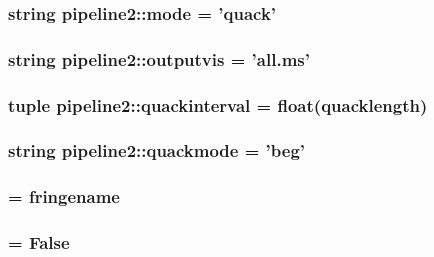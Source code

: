 \hypertarget{namespacepipeline2_a64dbb436e00eaaf809aca44a0584bceb}{
\subsubsection[{mode}]{\setlength{\rightskip}{0pt plus 5cm}string {\bf pipeline2\-::mode} = 'quack'}}\label{namespacepipeline2_a64dbb436e00eaaf809aca44a0584bceb}
\hypertarget{namespacepipeline2_aee0f088648acf71251824b2f6ecc7782}{
\subsubsection[{outputvis}]{\setlength{\rightskip}{0pt plus 5cm}string {\bf pipeline2\-::outputvis} = 'all.\-ms'}}\label{namespacepipeline2_aee0f088648acf71251824b2f6ecc7782}
\hypertarget{namespacepipeline2_a93c2f9801b34cbceec33031b6ba03699}{
\subsubsection[{quackinterval}]{\setlength{\rightskip}{0pt plus 5cm}tuple {\bf pipeline2\-::quackinterval} = float(quacklength)}}\label{namespacepipeline2_a93c2f9801b34cbceec33031b6ba03699}
\hypertarget{namespacepipeline2_a129fb733ea70148d293b8b4ac5b760e3}{
\subsubsection[{quackmode}]{\setlength{\rightskip}{0pt plus 5cm}string {\bf pipeline2\-::quackmode} = 'beg'}}\label{namespacepipeline2_a129fb733ea70148d293b8b4ac5b760e3}
\hypertarget{namespacepipeline2_aee2c9efd24537f7f72f37ea4c0fae8cc}{
\subsubsection[{reference}]{ = fringename}}\label{namespacepipeline2_aee2c9efd24537f7f72f37ea4c0fae8cc}
\hypertarget{namespacepipeline2_a1e993f36d3fc958f5a1af7e539962f52}{
\subsubsection[{reuse}]{ = \-False}}\label{namespacepipeline2_a1e993f36d3fc958f5a1af7e539962f52}
